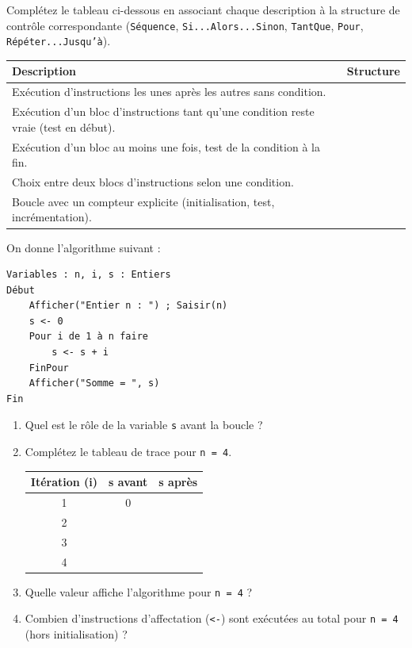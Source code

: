 \documentclass[11pt]{article}
\begin{document}
\begin{exercice}
Complétez le tableau ci-dessous en associant chaque description à la structure de contrôle correspondante (\texttt{Séquence}, \texttt{Si...Alors...Sinon}, \texttt{TantQue}, \texttt{Pour}, \texttt{Répéter...Jusqu'à}).
\begin{center}
\begin{tabularx}{\linewidth}{|X|c|}
\hline
\textbf{Description} & \textbf{Structure} \\
\hline
Exécution d'instructions les unes après les autres sans condition. & \\
\hline
Exécution d'un bloc d'instructions tant qu'une condition reste vraie (test en début). & \\
\hline
Exécution d'un bloc au moins une fois, test de la condition à la fin. & \\
\hline
Choix entre deux blocs d'instructions selon une condition. & \\
\hline
Boucle avec un compteur explicite (initialisation, test, incrémentation). & \\
\hline
\end{tabularx}
\end{center}
\end{exercice}

\begin{exercice}
On donne l'algorithme suivant :
\begin{verbatim}
Variables : n, i, s : Entiers
Début
    Afficher("Entier n : ") ; Saisir(n)
    s <- 0
    Pour i de 1 à n faire
        s <- s + i
    FinPour
    Afficher("Somme = ", s)
Fin
\end{verbatim}
\begin{enumerate}
    \item Quel est le rôle de la variable \texttt{s} avant la boucle ?
    \item Complétez le tableau de trace pour \texttt{n = 4}.
    \begin{center}
    \begin{tabular}{|c|c|c|}
    \hline
    \textbf{Itération (i)} & \textbf{s avant} & \textbf{s après} \\
    \hline
    1 & 0 & \\
    \hline
    2 & & \\
    \hline
    3 & & \\
    \hline
    4 & & \\
    \hline
    \end{tabular}
    \end{center}
    \item Quelle valeur affiche l'algorithme pour \texttt{n = 4} ?
    \item Combien d'instructions d'affectation (\texttt{<-}) sont exécutées au total pour \texttt{n = 4} (hors initialisation) ?
\end{enumerate}
\end{exercice}
\end{document}

